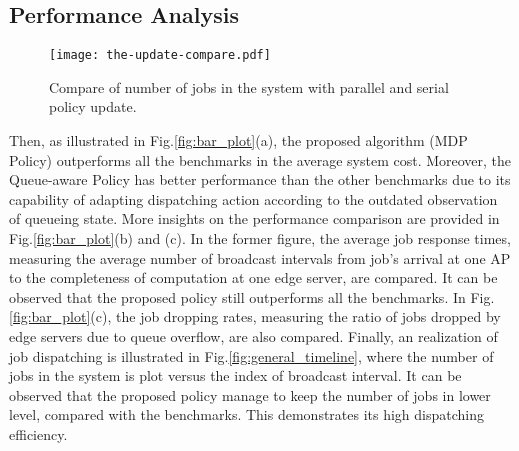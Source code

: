 \subsection{Performance Analysis}
\label{subsec:basic}
\begin{figure}[ht!]                                                                             %
    \centering                                                                                  %
    \texttt{[image: the-update-compare.pdf]}                              %
    \caption{ Compare of number of jobs in the system with parallel and serial policy update.}
    \label{fig:update}                                                                %
\end{figure}                                                                                    %

Then, as illustrated in Fig.\ref{fig:bar_plot}(a), the proposed algorithm (MDP Policy) outperforms all the benchmarks in the average system cost.
Moreover, the Queue-aware Policy has better performance than the other benchmarks due to its capability of adapting dispatching action according to the outdated observation of queueing state.
More insights on the performance comparison are provided in Fig.\ref{fig:bar_plot}(b) and (c).
In the former figure, the average job response times, measuring the average number of broadcast intervals from job's arrival at one AP to the completeness of computation at one edge server, are compared.
It can be observed that the proposed policy still outperforms all the benchmarks.
In Fig.\ref{fig:bar_plot}(c), the job dropping rates, measuring the ratio of jobs dropped by edge servers due to queue overflow, are also compared.
Finally, an realization of job dispatching is illustrated in Fig.\ref{fig:general_timeline}, where the number of jobs in the system is plot versus the index of broadcast interval.
It can be observed that the proposed policy manage to keep the number of jobs in lower level, compared with the benchmarks.
This demonstrates its high dispatching efficiency.

